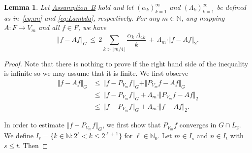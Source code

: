 \documentclass[10pt,a4paper]{amsart}
\newtheorem{lemma}{Lemma}
\begin{document}
\begin{lemma}\label{lem:lift}
 Let \hyperlink{assum}{Assumption~B} hold and let 
 $(\alpha_k)_{k=1}^\infty$ and $(\Lambda_k)_{k=1}^\infty$ be defined as in~\eqref{eq:an} and \eqref{eq:Lambda}, respectively.
 For any $m\in\mathbb{N}$, any mapping $A\colon F \to V_m$ and all $f\in F$,  we have
 \begin{equation*}%
  \Vert f - Af\Vert_{G}\,\le\, 
  2 \sum_{k > \lfloor m/4 \rfloor 
    } \frac{ \alpha_k \, \Lambda_{4k}}{k} 
  \,+\, \Lambda_m \cdot \Vert f-Af\Vert_2.
 \end{equation*}
 \end{lemma}

 \begin{proof}
Note that there is nothing to prove if the right hand side of the inequality %
is infinite
 so we may assume that it is finite.
We first observe
\begin{align*}
 \Vert f - A f  \Vert_{G}
&\le\, \Vert f - P_{V_m} f \Vert_{G} + \Vert P_{V_m} f - A f \Vert_{G}\\
&\le\, \Vert f - P_{V_m} f \Vert_{G} + \Lambda_m \cdot \Vert P_{V_m}f - A f \Vert_{2}\\
&\le\, \Vert f - P_{V_m} f \Vert_{G} + \Lambda_m \cdot \Vert f - A f \Vert_{2}.
\end{align*}


In order to estimate $\Vert f - P_{V_m} f \Vert_G$,
we first 
show that $P_{V_m} f$ converges in $G\cap L_2$.
We 
 {define}
$I_\ell = \{ k \in \mathbb{N} \colon 2^{\ell}<  k \leq 2^{\ell+1}\}$ for $\ell\in\mathbb{N}_0$. Let $m\in I_s$ and $n\in I_t$ with $s\le t$. Then


\end{proof}
\end{document}
